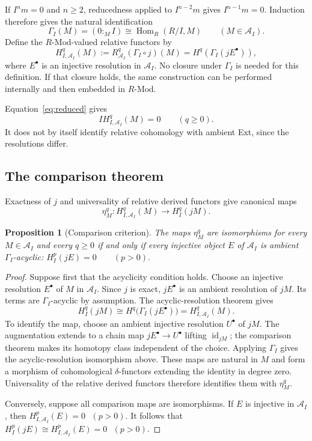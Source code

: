 \documentclass[11pt,reqno]{amsart}
\newtheorem{proposition}[theorem]{Proposition}
\theoremstyle{definition}
\theoremstyle{remark}
\newcommand{\Mod}{\text{-}\mathrm{Mod}}
\newcommand{\Hom}{\operatorname{Hom}}
\newcommand{\A}{\mathcal A_I}
\begin{document}
If $I^n m=0$ and $n\geq2$, reducedness applied to $I^{n-2}m$ gives $I^{n-1}m=0$. Induction therefore gives the natural identification
\begin{equation}\label{eq:reduced}
\Gamma_I(M)=(0:_M I)\cong\Hom_R(R/I,M)\qquad(M\in\A).
\end{equation}
Define the $R\Mod$-valued relative functors by
\[
H_{I,\A}^q(M):=R^q_{\A}(\Gamma_I\circ j)(M)
=H^q(\Gamma_I(jE^\bullet)),
\]
where $E^\bullet$ is an injective resolution in $\A$. No closure under $\Gamma_I$ is needed for this definition. If that closure holds, the same construction can be performed internally and then embedded in $R\Mod$.

Equation~\eqref{eq:reduced} gives
\begin{equation}\label{eq:annihilation}
I H_{I,\A}^q(M)=0\qquad(q\geq0).
\end{equation}
It does not by itself identify relative cohomology with ambient Ext, since the resolutions differ.

\subsection{The comparison theorem}
Exactness of $j$ and universality of relative derived functors give canonical maps
\[
\eta_M^q:H_{I,\A}^q(M)\longrightarrow H_I^q(jM).
\]
\begin{proposition}[Comparison criterion]\label{Comp:Thm}
The maps $\eta_M^q$ are isomorphisms for every
$M\in\A$ and every $q\geq 0$ if and only if every
injective object $E$ of $\A$ is ambient
$\Gamma_I$-acyclic:
\(H_I^p(jE)=0\qquad(p>0).\)
\end{proposition}

\begin{proof}
Suppose first that the acyclicity condition holds.
Choose an injective resolution $E^\bullet$ of $M$ in $\A$.
Since $j$ is exact, $jE^\bullet$ is an ambient resolution
of $jM$. Its terms are $\Gamma_I$-acyclic by assumption.
The acyclic-resolution theorem \cite[Section~2.5]{Weibel1994} gives
\[
H_I^q(jM)
\cong H^q\bigl(\Gamma_I(jE^\bullet)\bigr)
=H^q_{I,\A}(M).
\]
To identify the map, choose an ambient injective resolution $U^\bullet$ of $jM$. The augmentation extends to a chain map $jE^\bullet\to U^\bullet$ lifting $\operatorname{id}_{jM}$; the comparison theorem makes its homotopy class independent of the choice. Applying $\Gamma_I$ gives the acyclic-resolution isomorphism above. These maps are natural in $M$ and form a morphism of cohomological $\delta$-functors extending the identity in degree zero. Universality of the relative derived functors therefore identifies them with $\eta_M^q$.

Conversely, suppose all comparison maps are isomorphisms.
If $E$ is injective in $\A$, then
\(H^p_{I,\A}(E)=0\text{  }(p>0).\) It follows that \(H_I^p(jE)\cong H^p_{I,\A}(E)=0\text{  }(p>0).\)
\end{proof}
\end{document}
